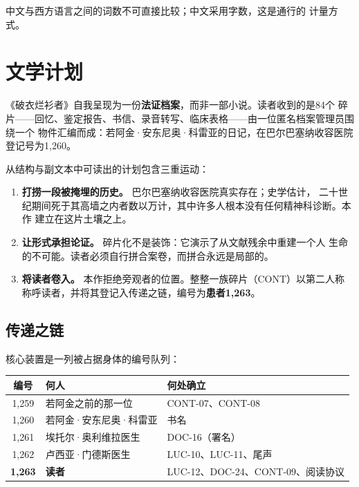 \documentclass[11pt,a4paper]{article}
\begin{document}
\noindent\small 中文与西方语言之间的词数不可直接比较；中文采用字数，这是通行的
计量方式。

\section{文学计划}

《破衣烂衫者》自我呈现为一份\textbf{法证档案}，而非一部小说。读者收到的是84个
碎片——回忆、鉴定报告、书信、录音转写、临床表格——由一位匿名档案管理员围绕一个
物件汇编而成：若阿金·安东尼奥·科雷亚的日记，在巴尔巴塞纳收容医院登记号为1,260。

从结构与副文本中可读出的计划包含三重运动：

\begin{enumerate}
\item \textbf{打捞一段被掩埋的历史。} 巴尔巴塞纳收容医院真实存在；史学估计，
二十世纪期间死于其高墙之内者数以万计，其中许多人根本没有任何精神科诊断。本作
建立在这片土壤之上。

\item \textbf{让形式承担论证。} 碎片化不是装饰：它演示了从文献残余中重建一个人
生命的不可能。读者必须自行拼合案卷，而拼合永远是局部的。

\item \textbf{将读者卷入。} 本作拒绝旁观者的位置。整整一族碎片（CONT）以第二人称
称呼读者，并将其登记入传递之链，编号为\textbf{患者1,263}。
\end{enumerate}

\subsection{传递之链}

核心装置是一列被占据身体的编号队列：

\begin{center}\small
\begin{tabular}{@{}cll@{}}
\toprule
\textbf{编号} & \textbf{何人} & \textbf{何处确立} \\
\midrule
1,259 & 若阿金之前的那一位 & CONT-07、CONT-08 \\
1,260 & 若阿金·安东尼奥·科雷亚 & 书名 \\
1,261 & 埃托尔·奥利维拉医生 & DOC-16（署名） \\
1,262 & 卢西亚·门德斯医生 & LUC-10、LUC-11、尾声 \\
\textbf{1,263} & \textbf{读者} & LUC-12、DOC-24、CONT-09、阅读协议 \\
\bottomrule
\end{tabular}
\end{center}
\end{document}
